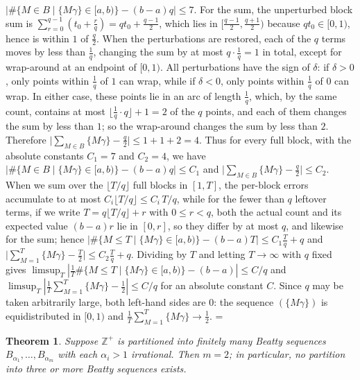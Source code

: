 \documentclass[11pt]{article}
\makeatletter
\let\nt@closedisplay\]
\def\nt@guardedclose{\@ifnextchar\par{\nt@closeafterpar}{\@ifnextchar\end{\postdisplaypenalty\@M\nt@closedisplay}{\nt@closedisplay}}}
\def\nt@closeafterpar\par{\@ifnextchar\par{\nt@closeafterpar}{\@ifnextchar\end{\postdisplaypenalty\@M\nt@closedisplay\par}{\nt@closedisplay\par}}}
\renewenvironment{proof}[1][\proofname]{\par
  \pushQED{\qed}\normalfont\topsep\medskipamount\edef\nt@afterproof{\@endparpenalty=\the\@endparpenalty\relax}\@beginparpenalty\@M\@endparpenalty\@M\let\]\nt@guardedclose\trivlist\item[]\textit{#1\@addpunct{.}} \ignorespaces}{\ifvmode\addpenalty\@M\fi\popQED\nt@afterproof\endtrivlist\@endpefalse}
\theoremstyle{ntstyle}
\newtheorem{theorem}{Theorem}[subsection]
\makeatother
\begin{document}
\begin{proof}
  $\big|\#\{M\in B \mid \{M\gamma\}\in[a,b)\}-(b-a)q\big|\le 7$.
  For the sum, the unperturbed block sum is
  $\sum_{r=0}^{q-1}(t_0+\tfrac{r}{q})=qt_0+\tfrac{q-1}{2}$, which lies in
  $\big[\tfrac{q-1}{2},\tfrac{q+1}{2}\big)$ because $qt_0\in[0,1)$, hence
  is within $1$ of $\tfrac{q}{2}$. When the perturbations are restored, each of
  the $q$ terms moves by less than $\tfrac{1}{q}$, changing the sum by at most
  $q\cdot\tfrac{1}{q}=1$ in total, except for wrap-around at an endpoint
  of $[0,1)$. All perturbations have the sign of $\delta$: if $\delta>0$,
  only points within $\tfrac{1}{q}$ of $1$ can wrap, while if $\delta<0$,
  only points within $\tfrac{1}{q}$ of $0$ can wrap. In either case, these
  points lie in an arc of length $\tfrac{1}{q}$, which, by the same count, contains at most
  $\lfloor\tfrac{1}{q}\cdot q\rfloor + 1 = 2$ of the $q$ points, and each
  of them changes the sum by less than $1$; so the wrap-around changes the
  sum by less than $2$. Therefore
  $\big|\sum_{M\in B}\{M\gamma\}-\tfrac{q}{2}\big|\le 1+1+2=4$.
  Thus for every full block, with the absolute constants $C_1=7$ and
  $C_2=4$, we have $\big|\#\{M\in B \mid \{M\gamma\}\in[a,b)\}-(b-a)q\big|\le C_1$
  and $\big|\sum_{M\in B}\{M\gamma\}-\tfrac{q}{2}\big|\le C_2$. When we sum
  over the $\lfloor T/q\rfloor$ full blocks in $[1,T]$, the per-block
  errors accumulate to at most $C_i\lfloor T/q\rfloor\le C_i\,T/q$,
  while for the fewer than $q$ leftover terms, if we write
  $T=q\lfloor T/q\rfloor+r$ with $0\le r<q$, both the actual count and
  its expected value $(b-a)r$ lie in $[0,r]$, so they differ by at
  most $q$, and likewise for the sum; hence $\big|\#\{M\le T \mid \{M\gamma\}\in[a,b)\}-(b-a)T\big|\le C_1\tfrac{T}{q}+q$ and
  $\big|\sum_{M=1}^T\{M\gamma\}-\tfrac{T}{2}\big|\le C_2\tfrac{T}{q}+q$.
  Dividing by $T$ and letting $T\to\infty$ with $q$ fixed gives
  $\limsup_T|\tfrac{1}{T}\#\{M\le T \mid \{M\gamma\}\in[a,b)\}-(b-a)|\le C/q$
  and $\limsup_T|\tfrac{1}{T}\sum_{M=1}^T\{M\gamma\}-\tfrac{1}{2}|\le C/q$ for
  an absolute constant $C$. Since $q$ may be taken arbitrarily large,
  both left-hand sides are $0$: the sequence $(\{M\gamma\})$ is
  equidistributed in $[0,1)$ and
  $\tfrac{1}{T}\sum_{M=1}^T\{M\gamma\}\to\tfrac{1}{2}$.
\end{proof}

\begin{theorem}\label{thm:10.2.3} Suppose $\mathbb{Z}^+$
  is partitioned into finitely many Beatty sequences
  $B_{\alpha_1},\ldots,B_{\alpha_m}$ with each $\alpha_i>1$ irrational.
  Then $m=2$; in particular, no partition into three or more Beatty
  sequences exists.

\end{theorem}
\end{document}
